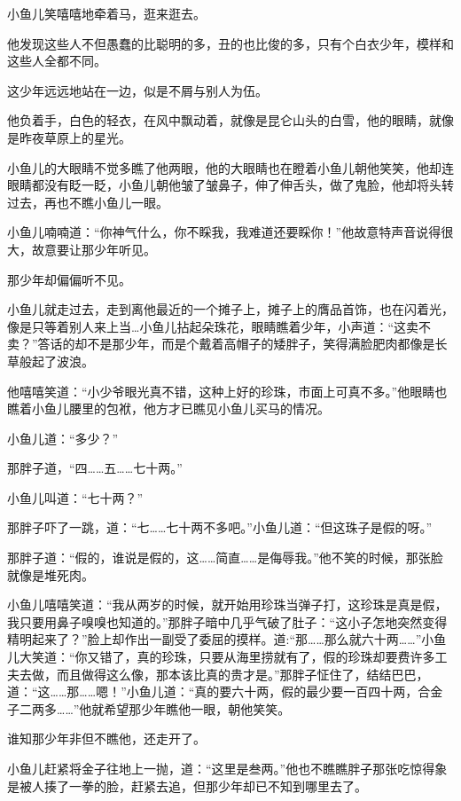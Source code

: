\documentclass[12pt,oneside]{book}
\begin{document}
小鱼儿笑嘻嘻地牵着马，逛来逛去。

他发现这些人不但愚蠢的比聪明的多，丑的也比俊的多，只有个白衣少年，模样和这些人全都不同。

这少年远远地站在一边，似是不屑与别人为伍。

他负着手，白色的轻衣，在风中飘动着，就像是昆仑山头的白雪，他的眼睛，就像是昨夜草原上的星光。

小鱼儿的大眼睛不觉多瞧了他两眼，他的大眼睛也在瞪着小鱼儿朝他笑笑，他却连眼睛都没有眨一眨，小鱼儿朝他皱了皱鼻子，伸了伸舌头，做了鬼脸，他却将头转过去，再也不瞧小鱼儿一眼。

小鱼儿喃喃道：``你神气什么，你不睬我，我难道还要睬你！''他故意特声音说得很大，故意要让那少年听见。

那少年却偏偏听不见。

小鱼儿就走过去，走到离他最近的一个摊子上，摊子上的膺品首饰，也在闪着光，像是只等着别人来上当\ldots 小鱼儿拈起朵珠花，眼睛瞧着少年，小声道：``这卖不卖？''答话的却不是那少年，而是个戴着高帽子的矮胖子，笑得满脸肥肉都像是长草般起了波浪。

他嘻嘻笑道：``小少爷眼光真不错，这种上好的珍珠，市面上可真不多。''他眼睛也瞧着小鱼儿腰里的包袱，他方才已瞧见小鱼儿买马的情况。

小鱼儿道：``多少？''

那胖子道，``四\ldots\ldots 五\ldots\ldots 七十两。''

小鱼儿叫道：``七十两？''

那胖子吓了一跳，道：``七\ldots\ldots 七十两不多吧。''小鱼儿道：``但这珠子是假的呀。''

那胖子道：``假的，谁说是假的，这\ldots\ldots 简直\ldots\ldots 是侮辱我。''他不笑的时候，那张脸就像是堆死肉。

小鱼儿嘻嘻笑道：``我从两岁的时候，就开始用珍珠当弹子打，这珍珠是真是假，我只要用鼻子嗅嗅也知道的。''那胖子暗中几乎气破了肚子：``这小子怎地突然变得精明起来了？''脸上却作出一副受了委屈的摸样。道:``那\ldots\ldots 那么就六十两\ldots\ldots{}''小鱼儿大笑道：``你又错了，真的珍珠，只要从海里捞就有了，假的珍珠却要费许多工夫去做，而且做得这么像，那本该比真的贵才是。''那胖子怔住了，结结巴巴，道：``这\ldots\ldots 那\ldots\ldots 嗯！''小鱼儿道：``真的要六十两，假的最少要一百四十两，合金子二两多\ldots\ldots{}''他就希望那少年瞧他一眼，朝他笑笑。

谁知那少年非但不瞧他，还走开了。

小鱼儿赶紧将金子往地上一抛，道：``这里是叁两。''他也不瞧瞧胖子那张吃惊得象是被人揍了一拳的脸，赶紧去追，但那少年却已不知到哪里去了。
\end{document}
